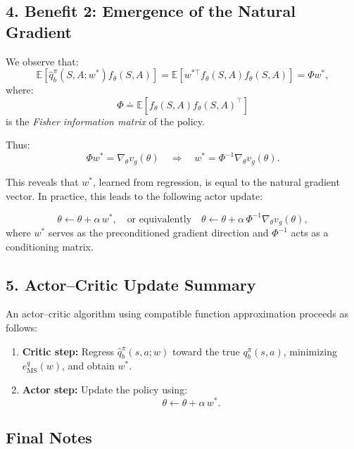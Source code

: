 \subsection*{4. Benefit 2: Emergence of the Natural Gradient}

We observe that:
\[
\mathbb{E}\left[\hat{q}_b^\pi(S,A;w^*) f_\theta(S,A)\right]
= \mathbb{E}\left[w^{*\top} f_\theta(S,A) f_\theta(S,A)\right]
= \Phi w^*,
\]
where:
\[
\Phi \doteq \mathbb{E}\left[f_\theta(S,A) f_\theta(S,A)^\top\right]
\]
is the \emph{Fisher information matrix} of the policy.

Thus:
\[
\Phi w^* = \nabla_\theta v_g(\theta)
\quad \Rightarrow \quad
w^* = \Phi^{-1} \nabla_\theta v_g(\theta).
\]

This reveals that \(w^*\), learned from regression, is equal to the natural gradient vector. In practice, this leads to the following actor update:

\[
\theta \gets \theta + \alpha \, w^*,
\quad \text{or equivalently} \quad
\theta \gets \theta + \alpha \, \Phi^{-1} \nabla_\theta v_g(\theta),
\]
where \(w^*\) serves as the preconditioned gradient direction and \(\Phi^{-1}\) acts as a conditioning matrix.

\subsection*{5. Actor–Critic Update Summary}

An actor–critic algorithm using compatible function approximation proceeds as follows:
\begin{enumerate}
  \item \textbf{Critic step:} Regress \(\hat{q}_b^\pi(s,a;w)\) toward the true \(q_b^\pi(s,a)\), minimizing \(e_{\text{MS}}^q(w)\), and obtain \(w^*\).
  \item \textbf{Actor step:} Update the policy using:
  \[
  \theta \gets \theta + \alpha \, w^*.
  \]
\end{enumerate}

\subsection*{Final Notes}

